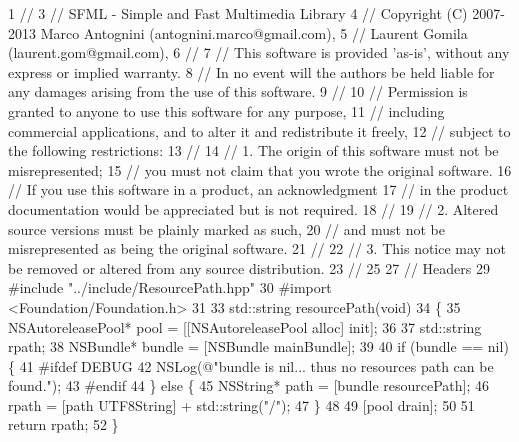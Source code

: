 \begin{DoxyCodeInclude}
1 \textcolor{comment}{//}
3 \textcolor{comment}{// SFML - Simple and Fast Multimedia Library}
4 \textcolor{comment}{// Copyright (C) 2007-2013 Marco Antognini (antognini.marco@gmail.com),}
5 \textcolor{comment}{//                         Laurent Gomila (laurent.gom@gmail.com),}
6 \textcolor{comment}{//}
7 \textcolor{comment}{// This software is provided 'as-is', without any express or implied warranty.}
8 \textcolor{comment}{// In no event will the authors be held liable for any damages arising from the use of this software.}
9 \textcolor{comment}{//}
10 \textcolor{comment}{// Permission is granted to anyone to use this software for any purpose,}
11 \textcolor{comment}{// including commercial applications, and to alter it and redistribute it freely,}
12 \textcolor{comment}{// subject to the following restrictions:}
13 \textcolor{comment}{//}
14 \textcolor{comment}{// 1. The origin of this software must not be misrepresented;}
15 \textcolor{comment}{//    you must not claim that you wrote the original software.}
16 \textcolor{comment}{//    If you use this software in a product, an acknowledgment}
17 \textcolor{comment}{//    in the product documentation would be appreciated but is not required.}
18 \textcolor{comment}{//}
19 \textcolor{comment}{// 2. Altered source versions must be plainly marked as such,}
20 \textcolor{comment}{//    and must not be misrepresented as being the original software.}
21 \textcolor{comment}{//}
22 \textcolor{comment}{// 3. This notice may not be removed or altered from any source distribution.}
23 \textcolor{comment}{//}
25 \textcolor{comment}{}
27 \textcolor{comment}{// Headers}
29 \textcolor{comment}{}\textcolor{preprocessor}{#include "../include/ResourcePath.hpp"}
30 \textcolor{preprocessor}{#import <Foundation/Foundation.h>}
31 
33 std::string resourcePath(\textcolor{keywordtype}{void})
34 \{
35     NSAutoreleasePool* pool = [[NSAutoreleasePool alloc] init];
36 
37     std::string rpath;
38     NSBundle* bundle = [NSBundle mainBundle];
39 
40     \textcolor{keywordflow}{if} (bundle == nil) \{
41 \textcolor{preprocessor}{#ifdef DEBUG}
42         NSLog(\textcolor{stringliteral}{@"bundle is nil... thus no resources path can be found."});
43 \textcolor{preprocessor}{#endif}
44     \} \textcolor{keywordflow}{else} \{
45         NSString* path = [bundle resourcePath];
46         rpath = [path UTF8String] + std::string("/");
47     \}
48 
49     [pool drain];
50 
51     \textcolor{keywordflow}{return} rpath;
52 \}
\end{DoxyCodeInclude}
